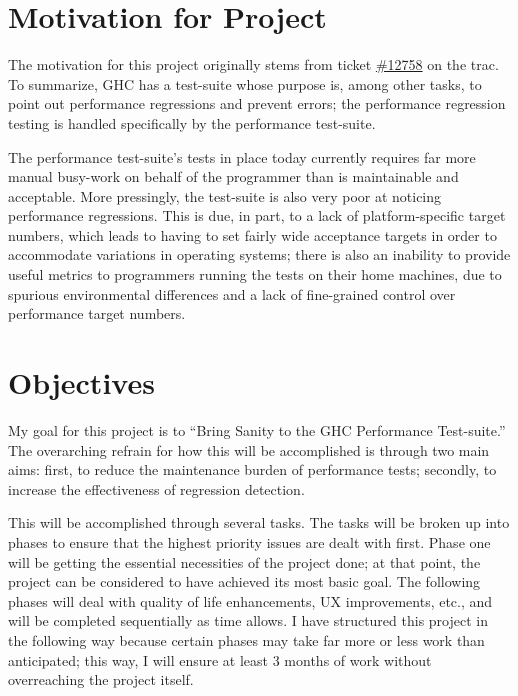 \documentclass{article}
\author{Jared Weakly}
\date{\today}
\title{\project}
\newcommand*\project{Bring Sanity to the GHC Performance Test-suite}
\begin{document}
\maketitle

\section*{Motivation for Project}
The motivation for this project originally stems from ticket \href{https://ghc.haskell.org/trac/ghc/ticket/12758}{\#12758} on the trac.
To summarize, GHC has a test-suite whose purpose is, among other tasks, to point out performance regressions and prevent errors;
the performance regression testing is handled specifically by the performance test-suite.

The performance test-suite's tests in place today currently requires far more manual busy-work on behalf of the programmer than is maintainable and acceptable.
More pressingly, the test-suite is also very poor at noticing performance regressions.
This is due, in part, to a lack of platform-specific target numbers, which leads to having to set fairly wide acceptance targets in order to accommodate variations in operating systems;
there is also an inability to provide useful metrics to programmers running the tests on their home machines, due to spurious environmental differences and a lack of fine-grained control over performance target numbers.


\section*{Objectives}
My goal for this project is to ``\project.''
The overarching refrain for how this will be accomplished is through two main aims:
first, to reduce the maintenance burden of performance tests;
secondly, to increase the effectiveness of regression detection.

This will be accomplished through several tasks.
The tasks will be broken up into phases to ensure that the highest priority issues are dealt with first.
Phase one will be getting the essential necessities of the project done; at that point, the project can be considered to have achieved its most basic goal.
The following phases will deal with quality of life enhancements, UX improvements, etc., and will be completed sequentially as time allows.
I have structured this project in the following way because certain phases may take far more or less work than anticipated;
this way, I will ensure at least 3 months of work without overreaching the project itself.
\end{document}
